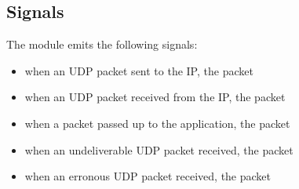 
\subsection{Signals}

The  module emits the following signals:
\begin{itemize}
  \item {} when an UDP packet sent to the IP, the packet
  \item {} when an UDP packet received from the IP, the packet
  \item {} when a packet passed up to the application, the packet
  \item {} when an undeliverable UDP packet received, the packet
  \item {} when an erronous UDP packet received, the packet
\end{itemize}

\fi


